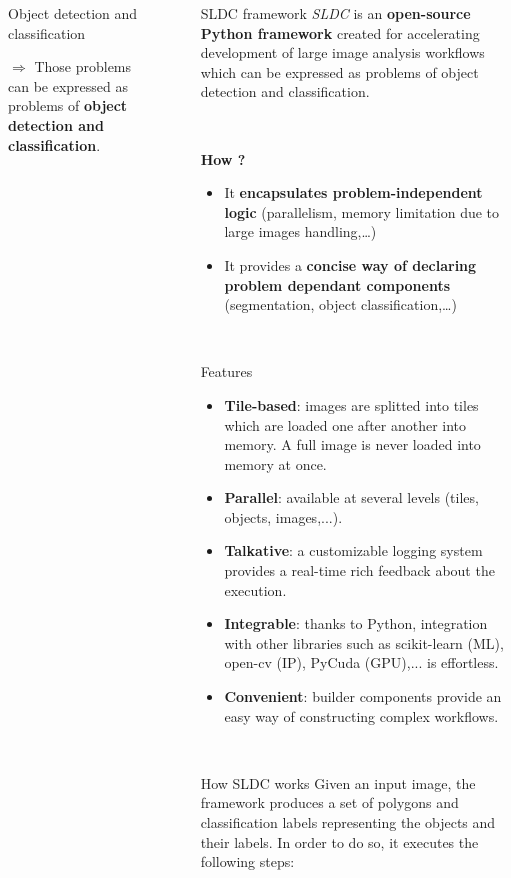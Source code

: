 \documentclass{beamer}
\begin{document}
\begin{frame}
\begin{columns}[t]
\begin{block}{Object detection and classification}
\begin{center}
\large
$\Rightarrow$ Those problems can be expressed as problems of \textbf{object detection and classification}.
\end{center}

\end{block}

~~

\begin{block} {SLDC framework}
\textit{SLDC} is an \textbf{open-source Python framework} created for accelerating development of large image analysis workflows which can be expressed as problems of object detection and classification.

~

\textbf{How ?}
\begin{itemize}

\item It \textbf{encapsulates problem-independent logic} (parallelism, memory limitation due to large images handling,…)

\item It provides a \textbf{concise way of declaring problem dependant components} (segmentation, object classification,…)

\end{itemize}

~~

\begin{alertblock}{Features}
\begin{itemize}
\item \textbf{Tile-based}: images are splitted into tiles which are loaded one after another into memory. A full image is never loaded into memory at once.
\item \textbf{Parallel}: available at several levels (tiles, objects, images,...).
\item \textbf{Talkative}: a customizable logging system provides a real-time rich feedback about the execution.
\item \textbf{Integrable}: thanks to Python, integration with other libraries such as scikit-learn (ML), open-cv (IP), PyCuda (GPU),... is effortless.
\item \textbf{Convenient}: builder components provide an easy way of constructing complex workflows.
\end{itemize}
\end{alertblock}

~~ 

\begin{alertblock}{How SLDC works}
Given an input image, the framework produces a set of polygons and classification labels representing the objects and their labels. In order to do so, it executes the following steps: 


\end{alertblock}
\end{block}
\end{columns}
\end{frame}
\end{document}
